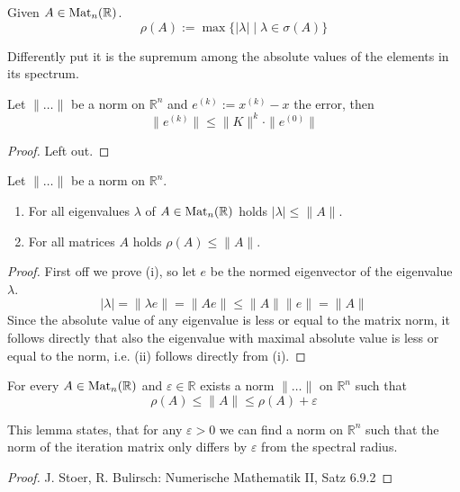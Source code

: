 \begin{definition}
   Given \(A \in \operatorname{Mat}_n(\mathbb{R})\).
   \[\rho(A) := \max\{|\lambda| \mid \lambda \in \sigma(A)\}\]
\end{definition}
\begin{remark}
   Differently put it is the supremum among the absolute values of the elements in its spectrum.
\end{remark}

\begin{lemma}
   Let \(\|\ldots\|\) be a norm on \(\mathbb{R}^n\) and \(e^{(k)} := x^{(k)} - x\) the error, then
   \[\|e^{(k)}\| \leq \|K\|^k \cdot \|e^{(0)}\|\]
\end{lemma}
\begin{proof}
   Left out.
\end{proof}

\begin{lemma}\label{lem:spec_rad_smaller_than_norm}
   Let \(\|\ldots\|\) be a norm on \(\mathbb{R}^n\).
   \begin{enumerate}[label=\roman*, align=Center]
      \item For all eigenvalues \(\lambda\) of \(A \in \operatorname{Mat}_n(\mathbb{R})\) holds \(|\lambda| \leq \|A\|\).
      \item For all matrices \(A\) holds \(\rho(A) \leq \|A\|\).
   \end{enumerate}
\end{lemma}
\begin{proof}
   First off we prove (i), so let \(e\) be the normed eigenvector of the eigenvalue \(\lambda\).
   \[|\lambda| = \|\lambda e\| = \|Ae\| \leq \|A\| \|e\| = \|A\|\]
   Since the absolute value of any eigenvalue is less or equal to the matrix norm, it follows directly that also the eigenvalue with maximal absolute value is less or equal to the norm, i.e. (ii) follows directly from (i).
\end{proof}

\begin{lemma}\label{lem:eps_norm}
   For every \(A \in \operatorname{Mat}_n(\mathbb{R})\) and \(\varepsilon \in \mathbb{R}\) exists a norm \(\|\ldots\|\) on \(\mathbb{R}^n\) such that
   \[\rho(A) \leq \|A\| \leq \rho(A) + \varepsilon\]
\end{lemma}
\begin{remark}
   This lemma states, that for any \(\varepsilon > 0\) we can find a norm on \(\mathbb{R}^n\) such that the norm of the iteration matrix only differs by \(\varepsilon\) from the spectral radius.
\end{remark}
\begin{proof}
   J. Stoer, R. Bulirsch: Numerische Mathematik II, Satz 6.9.2
\end{proof}

